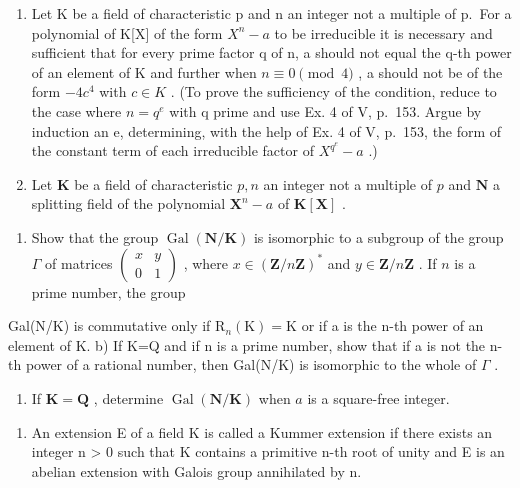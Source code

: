 \begin{enumerate}
\def\labelenumi{\arabic{enumi})}
\setcounter{enumi}{4}
\item
  Let K be a field of characteristic p and n an integer not a multiple of p.~For a polynomial of K{[}X{]} of the form \(X^{n} - a\) to be irreducible it is necessary and sufficient that for every prime factor q of n, a should not equal the q-th power of an element of K and further when \(n \equiv 0 \pmod{4}\) , a should not be of the form \(-4c^{4}\) with \(c \in K\) . (To prove the sufficiency of the condition, reduce to the case where \(n = q^{e}\) with q prime and use Ex. 4 of V, p.~153. Argue by induction an e, determining, with the help of Ex. 4 of V, p.~153, the form of the constant term of each irreducible factor of \(X^{q^{e}} - a\) .)
\item
  Let \(\mathbf{K}\) be a field of characteristic \(p, n\) an integer not a multiple of \(p\) and \(\mathbf{N}\) a splitting field of the polynomial \(\mathbf{X}^n - a\) of \(\mathbf{K}[\mathbf{X}]\) .
\end{enumerate}

\begin{enumerate}
\def\labelenumi{\alph{enumi})}
\tightlist
\item
  Show that the group \(\operatorname{Gal}(\mathbf{N} / \mathbf{K})\) is isomorphic to a subgroup of the group \(\Gamma\) of matrices \(\left( \begin{array}{cc}x & y\\ 0 & 1 \end{array} \right)\) , where \(x\in (\mathbf{Z} / n\mathbf{Z})^*\) and \(y\in \mathbf{Z} / n\mathbf{Z}\) . If \(n\) is a prime number, the group
\end{enumerate}

Gal(N/K) is commutative only if \(\mathrm{R}_{n}(\mathrm{K})=\mathrm{K}\) or if a is the n-th power of an element of K. b) If K=Q and if n is a prime number, show that if a is not the n-th power of a rational number, then Gal(N/K) is isomorphic to the whole of \(\Gamma\) .

\begin{enumerate}
\def\labelenumi{\alph{enumi})}
\setcounter{enumi}{2}
\tightlist
\item
  If \(\mathbf{K} = \mathbf{Q}\) , determine \(\operatorname{Gal}(\mathbf{N} / \mathbf{K})\) when \(a\) is a square-free integer.
\end{enumerate}

\begin{enumerate}
\def\labelenumi{\arabic{enumi})}
\setcounter{enumi}{6}
\tightlist
\item
  An extension E of a field K is called a Kummer extension if there exists an integer n \textgreater{} 0 such that K contains a primitive n-th root of unity and E is an abelian extension with Galois group annihilated by n.
\end{enumerate}

